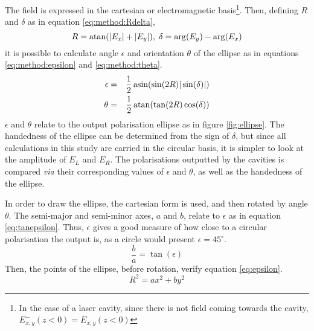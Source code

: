 The field is expressed in the cartesian or electromagnetic basis\footnote{In the case of a laser cavity, since there is not field coming towards the cavity, $E_{x,y}^-(z<0)=E_{x,y}(z<0)$}. Then, defining $R$ and $\delta$ as in equation \ref{eq:method:Rdelta},
\begin{equation}
R = \atan(|E_x|+|E_y|),\;\delta = \arg(E_y) - \arg(E_x) \label{eq:method:Rdelta}
\end{equation}
it is possible to calculate angle $\epsilon$ and orientation $\theta$ of the ellipse as in equations \ref{eq:method:epsilon} and \ref{eq:method:theta}\cite{weir_optical_2019}.
\begin{eqnarray}
\epsilon &=& \frac{1}{2}\asin(\sin(2R)|\sin(\delta)|) \label{eq:method:epsilon}\\
\theta &=& \frac{1}{2}\atan(\tan(2R)\cos(\delta)) \label{eq:method:theta}
\end{eqnarray}
$\epsilon$ and $\theta$ relate to the output polarisation ellipse as in figure \ref{fig:ellipse}. The handedness of the ellipse can be determined from the sign of $\delta$, but since all calculations in this study are carried in the circular basis, it is simpler to look at the amplitude of $E_L$ and $E_R$. The polarisations outputted by the cavities is compared \textit{via} their corresponding values of $\epsilon$ and $\theta$, as well as the handedness of the ellipse.

In order to draw the ellipse, the cartesian form is used, and then rotated by angle $\theta$. The semi-major and semi-minor axes, $a$ and $b$, relate to $\epsilon$ as in equation \ref{eq:tanepsilon}. Thus, $\epsilon$ gives a good measure of how close to a circular polarisation the output is, as a circle would present $\epsilon=45^\circ$.
\begin{equation}
\frac{b}{a}=\tan(\epsilon) \label{eq:tanepsilon}
\end{equation}
%
Then, the points of the ellipse, before rotation, verify equation \ref{eq:epsilon}.
\begin{equation}
R^2 = ax^2+by^2\label{eq:ellipse}
\end{equation}


